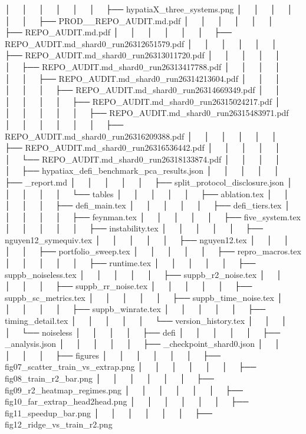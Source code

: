 │   │       │   │   │   │   ├── hypatiaX_three_systems.png
│   │       │   │   │   │   ├── PROD__REPO_AUDIT.md.pdf
│   │       │   │   │   │   ├── REPO_AUDIT.md.pdf
│   │       │   │   │   │   ├── REPO_AUDIT.md_shard0_run26312651579.pdf
│   │       │   │   │   │   ├── REPO_AUDIT.md_shard0_run26313011720.pdf
│   │       │   │   │   │   ├── REPO_AUDIT.md_shard0_run26313417788.pdf
│   │       │   │   │   │   ├── REPO_AUDIT.md_shard0_run26314213604.pdf
│   │       │   │   │   │   ├── REPO_AUDIT.md_shard0_run26314669349.pdf
│   │       │   │   │   │   ├── REPO_AUDIT.md_shard0_run26315024217.pdf
│   │       │   │   │   │   ├── REPO_AUDIT.md_shard0_run26315483971.pdf
│   │       │   │   │   │   ├── REPO_AUDIT.md_shard0_run26316209388.pdf
│   │       │   │   │   │   ├── REPO_AUDIT.md_shard0_run26316536442.pdf
│   │       │   │   │   │   └── REPO_AUDIT.md_shard0_run26318133874.pdf
│   │       │   │   │   ├── hypatiax_defi_benchmark_pca_results.json
│   │       │   │   │   ├── _report.md
│   │       │   │   │   ├── split_protocol_disclosure.json
│   │       │   │   │   └── tables
│   │       │   │   │       ├── ablation.tex
│   │       │   │   │       ├── defi_main.tex
│   │       │   │   │       ├── defi_tiers.tex
│   │       │   │   │       ├── feynman.tex
│   │       │   │   │       ├── five_system.tex
│   │       │   │   │       ├── instability.tex
│   │       │   │   │       ├── nguyen12_symequiv.tex
│   │       │   │   │       ├── nguyen12.tex
│   │       │   │   │       ├── portfolio_sweep.tex
│   │       │   │   │       ├── repro_macros.tex
│   │       │   │   │       ├── runtime.tex
│   │       │   │   │       ├── suppb_noiseless.tex
│   │       │   │   │       ├── suppb_r2_noise.tex
│   │       │   │   │       ├── suppb_rr_noise.tex
│   │       │   │   │       ├── suppb_sc_metrics.tex
│   │       │   │   │       ├── suppb_time_noise.tex
│   │       │   │   │       ├── suppb_winrate.tex
│   │       │   │   │       ├── timing_detail.tex
│   │       │   │   │       └── version_history.tex
│   │       │   │   └── noiseless
│   │       │   │       ├── defi
│   │       │   │       │   ├── _analysis.json
│   │       │   │       │   ├── _checkpoint_shard0.json
│   │       │   │       │   ├── figures
│   │       │   │       │   │   ├── fig07_scatter_train_vs_extrap.png
│   │       │   │       │   │   ├── fig08_train_r2_bar.png
│   │       │   │       │   │   ├── fig09_r2_heatmap_regimes.png
│   │       │   │       │   │   ├── fig10_far_extrap_head2head.png
│   │       │   │       │   │   ├── fig11_speedup_bar.png
│   │       │   │       │   │   ├── fig12_ridge_vs_train_r2.png

